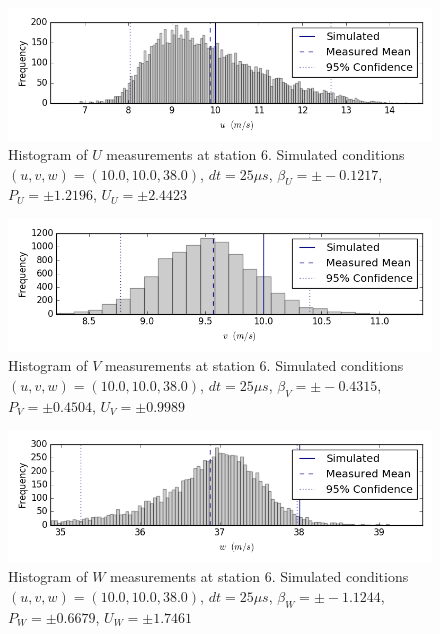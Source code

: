 \begin{figure}[H]
\centering
\includegraphics[width=6in]{figs/Ely_May28th06004/uncertainty_Ely_May28th06004_U}
\caption{Histogram of $U$ measurements at station 6. Simulated conditions $(u,v,w)=(10.0, 10.0, 38.0)$, $dt=25 \mu s$, $\beta_U=\pm -0.1217$, $P_U=\pm 1.2196$, $U_U=\pm 2.4423$}
\label{fig:uncertainty_Ely_May28th06004_U}
\end{figure}


\begin{figure}[H]
\centering
\includegraphics[width=6in]{figs/Ely_May28th06004/uncertainty_Ely_May28th06004_V}
\caption{Histogram of $V$ measurements at station 6. Simulated conditions $(u,v,w)=(10.0, 10.0, 38.0)$, $dt=25 \mu s$, $\beta_V=\pm -0.4315$, $P_V=\pm 0.4504$, $U_V=\pm 0.9989$}
\label{fig:uncertainty_Ely_May28th06004_V}
\end{figure}


\begin{figure}[H]
\centering
\includegraphics[width=6in]{figs/Ely_May28th06004/uncertainty_Ely_May28th06004_W}
\caption{Histogram of $W$ measurements at station 6. Simulated conditions $(u,v,w)=(10.0, 10.0, 38.0)$, $dt=25 \mu s$, $\beta_W=\pm -1.1244$, $P_W=\pm 0.6679$, $U_W=\pm 1.7461$}
\label{fig:uncertainty_Ely_May28th06004_W}
\end{figure}


